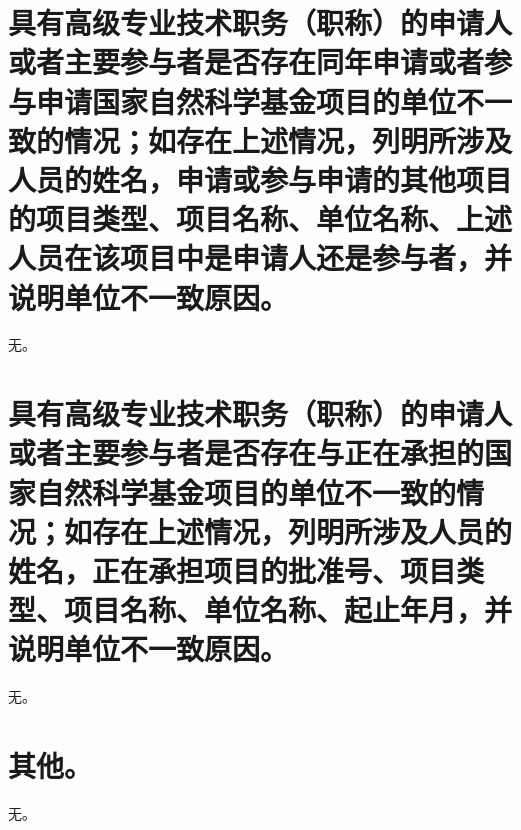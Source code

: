 \documentclass{nsfc}
\begin{document}
\section{具有高级专业技术职务（职称）的申请人或者主要参与者是否存在同年申请或者参与申请国家自然科学基金项目的单位不一致的情况；如存在上述情况，列明所涉及人员的姓名，申请或参与申请的其他项目的项目类型、项目名称、单位名称、上述人员在该项目中是申请人还是参与者，并说明单位不一致原因。}

无。

\section{具有高级专业技术职务（职称）的申请人或者主要参与者是否存在与正在承担的国家自然科学基金项目的单位不一致的情况；如存在上述情况，列明所涉及人员的姓名，正在承担项目的批准号、项目类型、项目名称、单位名称、起止年月，并说明单位不一致原因。}

无。

\section{其他。}

无。
\end{document}
